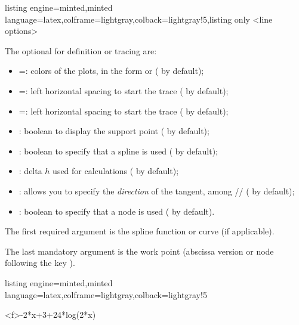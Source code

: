 \documentclass[11pt,a4paper]{ltxdoc}
\begin{document}
\begin{tcblisting}{listing engine=minted,minted language=latex,colframe=lightgray,colback=lightgray!5,listing only}
<line options>
\end{tcblisting}

The optional \MontreCode{[keys]} for definition or tracing are:

\begin{itemize}
	\item {} =: colors of the plots, in the form  or  ( by default);
	\item {} =: left horizontal spacing to start the trace ( by default);
	\item {} =: left horizontal spacing to start the trace ( by default);
	\item {}: boolean to display the support point ( by default);
	\item {}: boolean to specify that a spline is used ( by default);
	\item {}: delta $h$ used for calculations ( by default);
	\item {}: allows you to specify the \textit{direction} of the tangent, among // ( by default);
	\item {}: boolean to specify that a node is used ( by default).
\end{itemize}

\smallskip

The first required argument is the spline function or curve (if applicable).

\smallskip

The last mandatory argument is the work point (abscissa version or node following the key ).

\begin{tcblisting}{listing engine=minted,minted language=latex,colframe=lightgray,colback=lightgray!5}
\begin{GraphTikz}%
	[x=0.9cm,y=0.425cm,Xmin=4,Xmax=20,Origx=4,
	Ymin=40,Ymax=56,Ygrid=2,Ygrids=1,Origy=40]
	{-2*x+3+24*log(2*x)}
\end{GraphTikz}
\end{tcblisting}
\end{document}
